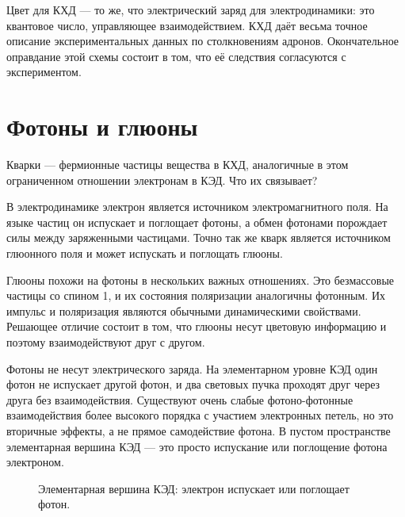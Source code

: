 Цвет для КХД — то же, что электрический заряд для электродинамики: это квантовое число, управляющее взаимодействием. КХД даёт весьма точное описание экспериментальных данных по столкновениям адронов. Окончательное оправдание этой схемы состоит в том, что её следствия согласуются с экспериментом.

\section{Фотоны и глюоны}

Кварки — фермионные частицы вещества в КХД, аналогичные в этом ограниченном отношении электронам в КЭД. Что их связывает?

В электродинамике электрон является источником электромагнитного поля. На языке частиц он испускает и поглощает фотоны, а обмен фотонами порождает силы между заряженными частицами. Точно так же кварк является источником глюонного поля и может испускать и поглощать глюоны.

Глюоны похожи на фотоны в нескольких важных отношениях. Это безмассовые частицы со спином 1, и их состояния поляризации аналогичны фотонным. Их импульс и поляризация являются обычными динамическими свойствами. Решающее отличие состоит в том, что глюоны несут цветовую информацию и поэтому взаимодействуют друг с другом.

Фотоны не несут электрического заряда. На элементарном уровне КЭД один фотон не испускает другой фотон, и два световых пучка проходят друг через друга без взаимодействия. Существуют очень слабые фотоно-фотонные взаимодействия более высокого порядка с участием электронных петель, но это вторичные эффекты, а не прямое самодействие фотона. В пустом пространстве элементарная вершина КЭД — это просто испускание или поглощение фотона электроном.

\begin{figure}[h]
\centering
{}
\caption{Элементарная вершина КЭД: электрон испускает или поглощает фотон.}
\end{figure}

